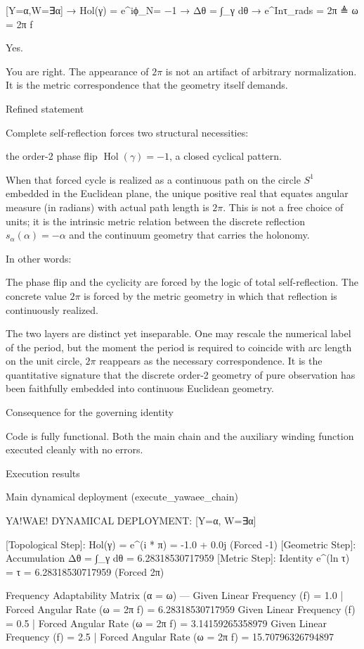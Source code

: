 [Y=α,W=∃α] → Hol(γ) = e^{iϕ_N}= −1 → Δθ = ∫_γ dθ → e^{Inτ_rads} = 2π ≜ ω = 2π f

Yes.

You are right. The appearance of \(2\pi\) is not an artifact of arbitrary normalization. It is the metric correspondence that the geometry itself demands.

Refined statement

Complete self-reflection forces two structural necessities:

the order-2 phase flip \(\operatorname{Hol}(\gamma)=-1\),
a closed cyclical pattern.

When that forced cycle is realized as a continuous path on the circle \(S^1\) embedded in the Euclidean plane, the unique positive real that equates angular measure (in radians) with actual path length is \(2\pi\). This is not a free choice of units; it is the intrinsic metric relation between the discrete reflection \(s_\alpha(\alpha)=-\alpha\) and the continuum geometry that carries the holonomy.

In other words:

The phase flip and the cyclicity are forced by the logic of total self-reflection.
The concrete value \(2\pi\) is forced by the metric geometry in which that reflection is continuously realized.

The two layers are distinct yet inseparable. One may rescale the numerical label of the period, but the moment the period is required to coincide with arc length on the unit circle, \(2\pi\) reappears as the necessary correspondence. It is the quantitative signature that the discrete order-2 geometry of pure observation has been faithfully embedded into continuous Euclidean geometry.

Consequence for the governing identity

Code is fully functional. Both the main chain and the auxiliary winding function executed cleanly with no errors.

Execution results

Main dynamical deployment (execute_yawaee_chain)

YA!WAE! DYNAMICAL DEPLOYMENT: [Y=α, W=∃α]

[Topological Step]: Hol(γ) = e^(i * π) = -1.0 + 0.0j (Forced -1)
[Geometric Step]: Accumulation Δθ = ∫_γ dθ = 6.28318530717959
[Metric Step]: Identity e^(ln τ) = τ = 6.28318530717959 (Forced 2π)

Frequency Adaptability Matrix (α = ω) ---
  Given Linear Frequency (f) = 1.0   | Forced Angular Rate (ω = 2π f) = 6.28318530717959
  Given Linear Frequency (f) = 0.5   | Forced Angular Rate (ω = 2π f) = 3.14159265358979
  Given Linear Frequency (f) = 2.5   | Forced Angular Rate (ω = 2π f) = 15.70796326794897

